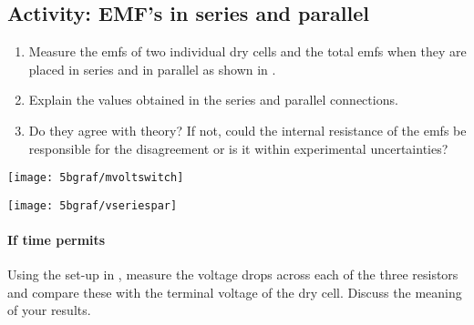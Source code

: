 \begin{multicols}{2}
\subsection{Activity: EMF's in series and parallel}
\begin{enumerate}
	\item Measure the emfs of two individual dry cells and the total emfs when they are placed in series and in parallel as shown in .
	
	\item Explain the values obtained in the series and parallel connections.
	
	\item Do they agree with theory?  If not, could the internal resistance of the emfs be responsible for the disagreement or is it within experimental uncertainties?
\end{enumerate}

%
%

\begin{center}
	\texttt{[image: 5bgraf/mvoltswitch]}
	\label{f:mvoltswitch}
\end{center}

\begin{center}
	\texttt{[image: 5bgraf/vseriespar]} %
	\label{f:vseriespar} %
\end{center}


\paragraph{If time permits}  Using the set-up in , measure the voltage drops across each of the three resistors and compare these with the terminal voltage of the dry cell.  Discuss the meaning of your results.

\end{multicols}



\endinput
